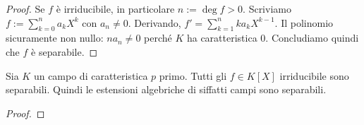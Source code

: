 \begin{proof}
Se $f$ è irriducibile, in particolare $n:=\deg f >0$. Scriviamo $f := \sum_{k = 0}^n a_kX^k$ con $a_n \ne 0$. Derivando, $f' = \sum_{k=1}^n ka_kX^{k-1}$. Il polinomio sicuramente non nullo: $n a_n \ne 0$ perché $K$ ha caratteristica $0$. Concludiamo quindi che $f$ è separabile.
\end{proof}

\begin{prop}
Sia $K$ un campo di caratteristica $p$ primo. Tutti gli $f \in K[X]$ irriducibile sono separabili. Quindi le estensioni algebriche di siffatti campi sono separabili. 
\end{prop}

\begin{proof}
\end{proof}

